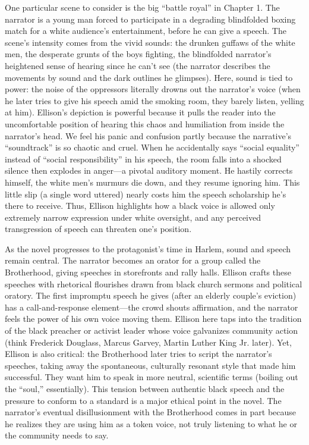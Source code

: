 \documentclass[12pt]{report}
\begin{document}
One particular scene to consider is the big “battle royal” in Chapter 1. The narrator is a young man forced to participate in a degrading blindfolded boxing match for a white audience’s entertainment, before he can give a speech. The scene’s intensity comes from the vivid sounds: the drunken guffaws of the white men, the desperate grunts of the boys fighting, the blindfolded narrator’s heightened sense of hearing since he can’t see (the narrator describes the movements by sound and the dark outlines he glimpses). Here, sound is tied to power: the noise of the oppressors literally drowns out the narrator’s voice (when he later tries to give his speech amid the smoking room, they barely listen, yelling at him). Ellison’s depiction is powerful because it pulls the reader into the uncomfortable position of hearing this chaos and humiliation from inside the narrator’s head. We feel his panic and confusion partly because the narrative’s “soundtrack” is so chaotic and cruel. When he accidentally says “social equality” instead of “social responsibility” in his speech, the room falls into a shocked silence then explodes in anger—a pivotal auditory moment. He hastily corrects himself, the white men’s murmurs die down, and they resume ignoring him. This little slip (a single word uttered) nearly costs him the speech scholarship he’s there to receive. Thus, Ellison highlights how a black voice is allowed only extremely narrow expression under white oversight, and any perceived transgression of speech can threaten one’s position.

As the novel progresses to the protagonist’s time in Harlem, sound and speech remain central. The narrator becomes an orator for a group called the Brotherhood, giving speeches in storefronts and rally halls. Ellison crafts these speeches with rhetorical flourishes drawn from black church sermons and political oratory. The first impromptu speech he gives (after an elderly couple’s eviction) has a call-and-response element—the crowd shouts affirmation, and the narrator feels the power of his own voice moving them. Ellison here taps into the tradition of the black preacher or activist leader whose voice galvanizes community action (think Frederick Douglass, Marcus Garvey, Martin Luther King Jr. later). Yet, Ellison is also critical: the Brotherhood later tries to script the narrator’s speeches, taking away the spontaneous, culturally resonant style that made him successful. They want him to speak in more neutral, scientific terms (boiling out the “soul,” essentially). This tension between authentic black speech and the pressure to conform to a standard is a major ethical point in the novel. The narrator’s eventual disillusionment with the Brotherhood comes in part because he realizes they are using him as a token voice, not truly listening to what he or the community needs to say.
\end{document}
